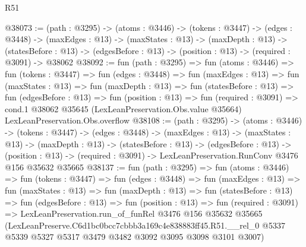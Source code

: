 \begin{lexlean}{R51}
\begin{coremodule}
@38073 := (path : @3295) ->
  (atoms : @3446) ->
  (tokens : @3447) ->
  (edges : @3448) ->
  (maxEdges : @13) ->
  (maxStates : @13) ->
  (maxDepth : @13) ->
  (statesBefore : @13) -> (edgesBefore : @13) -> (position : @13) -> (required : @3091) -> @38062
@38092 := fun (path : @3295) =>
  fun (atoms : @3446) =>
  fun (tokens : @3447) =>
  fun (edges : @3448) =>
  fun (maxEdges : @13) =>
  fun (maxStates : @13) =>
  fun (maxDepth : @13) =>
  fun (statesBefore : @13) =>
  fun (edgesBefore : @13) =>
  fun (position : @13) =>
  fun (required : @3091) =>
  cond.{1} @38062 @35645 (LexLeanPreservation.Obs.value @35664) LexLeanPreservation.Obs.overflow
@38108 := (path : @3295) ->
  (atoms : @3446) ->
  (tokens : @3447) ->
  (edges : @3448) ->
  (maxEdges : @13) ->
  (maxStates : @13) ->
  (maxDepth : @13) ->
  (statesBefore : @13) ->
  (edgesBefore : @13) ->
  (position : @13) -> (required : @3091) -> LexLeanPreservation.RunConv @3476 @156 @35632 @35665
@38137 := fun (path : @3295) =>
  fun (atoms : @3446) =>
  fun (tokens : @3447) =>
  fun (edges : @3448) =>
  fun (maxEdges : @13) =>
  fun (maxStates : @13) =>
  fun (maxDepth : @13) =>
  fun (statesBefore : @13) =>
  fun (edgesBefore : @13) =>
  fun (position : @13) =>
  fun (required : @3091) =>
  LexLeanPreservation.run_of_funRel
    @3476
    @156
    @35632
    @35665
    (LexLeanPreserve.C6d1bc0bcc7cbbb3a169c4e838883ff45.R51.__rel_0
      @5337
      @5339
      @5327
      @5317
      @3479
      @3482
      @3092
      @3095
      @3098
      @3101
      @3007)
\end{coremodule}
\end{lexlean}
